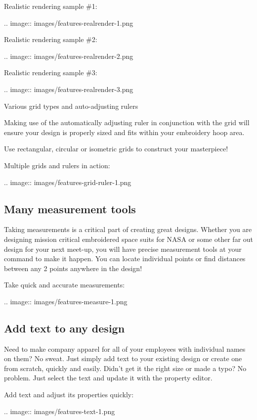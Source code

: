 \documentclass[10pt]{report}
\begin{document}
Realistic rendering sample \#1:

.. image::
   images/features-realrender-1.png

Realistic rendering sample \#2:

.. image::
   images/features-realrender-2.png

Realistic rendering sample \#3:

.. image::
   images/features-realrender-3.png

Various grid types and auto-adjusting rulers

Making use of the automatically adjusting ruler in conjunction with the grid will ensure your design is properly sized and fits within your embroidery hoop area.

Use rectangular, circular or isometric grids to construct your masterpiece!

Multiple grids and rulers in action:

.. image::
   images/features-grid-ruler-1.png

\subsection{Many measurement tools}

Taking measurements is a critical part of creating great designs. Whether you are designing mission critical embroidered space suits for NASA or some other far out design for your next meet-up, you will have precise measurement tools at your command to make it happen. You can locate individual points or find distances between any 2 points anywhere in the design!

Take quick and accurate measurements:

.. image::
   images/features-measure-1.png

\subsection{Add text to any design}

Need to make company apparel for all of your employees with individual names on them? No sweat. Just simply add text to your existing design or create one from scratch, quickly and easily.
Didn't get it the right size or made a typo? No problem. Just select the text and update it with the property editor.

Add text and adjust its properties quickly:

.. image::
   images/features-text-1.png
\end{document}
